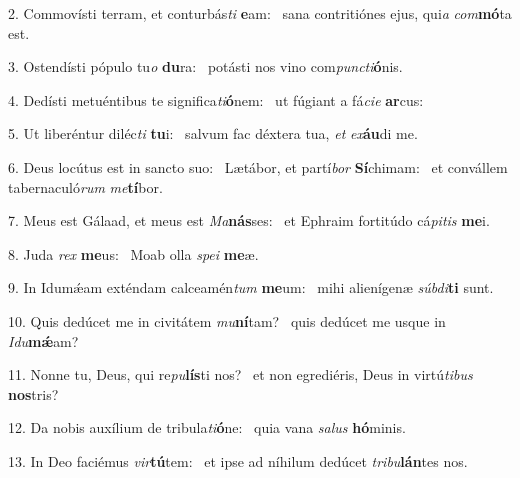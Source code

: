 2. Commovísti terram, et conturbás\textit{ti} \textbf{e}am: \ast\  sana contritiónes ejus, qui\textit{a} \textit{com}\textbf{mó}ta est.\

3. Ostendísti pópulo tu\textit{o} \textbf{du}ra: \ast\  potásti nos vino com\textit{punc}\textit{ti}\textbf{ó}nis.\

4. Dedísti metuéntibus te significa\textit{ti}\textbf{ó}nem: \ast\  ut fúgiant a fá\textit{ci}\textit{e} \textbf{ar}cus:\

5. Ut liberéntur diléc\textit{ti} \textbf{tu}i: \ast\  salvum fac déxtera tua, \textit{et} \textit{ex}\textbf{áu}di me.\

6. Deus locútus est in sancto suo: \dag\  Lætábor, et partí\textit{bor} \textbf{Sí}chimam: \ast\  et convállem tabernaculó\textit{rum} \textit{me}\textbf{tí}bor.\

7. Meus est Gálaad, et meus est \textit{Ma}\textbf{nás}ses: \ast\  et Ephraim fortitúdo cá\textit{pi}\textit{tis} \textbf{me}i.\

8. Juda \textit{rex} \textbf{me}us: \ast\  Moab olla \textit{spe}\textit{i} \textbf{me}æ.\

9. In Idumǽam exténdam calceamén\textit{tum} \textbf{me}um: \ast\  mihi alienígenæ \textit{súb}\textit{di}\textbf{ti} sunt.\

10. Quis dedúcet me in civitátem \textit{mu}\textbf{ní}tam? \ast\  quis dedúcet me usque in \textit{I}\textit{du}\textbf{mǽ}am?\

11. Nonne tu, Deus, qui re\textit{pu}\textbf{lís}ti nos? \ast\  et non egrediéris, Deus in virtú\textit{ti}\textit{bus} \textbf{nos}tris?\

12. Da nobis auxílium de tribula\textit{ti}\textbf{ó}ne: \ast\  quia vana \textit{sa}\textit{lus} \textbf{hó}minis.\

13. In Deo faciémus \textit{vir}\textbf{tú}tem: \ast\  et ipse ad níhilum dedúcet \textit{tri}\textit{bu}\textbf{lán}tes nos.\

